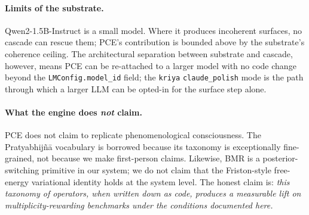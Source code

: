 \paragraph{Limits of the substrate.} Qwen2-1.5B-Instruct is a small model. Where it produces incoherent surfaces, no cascade can rescue them; PCE's contribution is bounded above by the substrate's coherence ceiling. The architectural separation between substrate and cascade, however, means PCE can be re-attached to a larger model with no code change beyond the \texttt{LMConfig.model\_id} field; the \texttt{kriya} \texttt{claude\_polish} mode is the path through which a larger LLM can be opted-in for the surface step alone.

\paragraph{What the engine does \emph{not} claim.} PCE does not claim to replicate phenomenological consciousness. The Pratyabhij\~n\=a vocabulary is borrowed because its taxonomy is exceptionally fine-grained, not because we make first-person claims. Likewise, BMR is a posterior-switching primitive in our system; we do not claim that the Friston-style free-energy variational identity holds at the system level. The honest claim is: \emph{this taxonomy of operators, when written down as code, produces a measurable lift on multiplicity-rewarding benchmarks under the conditions documented here.}
